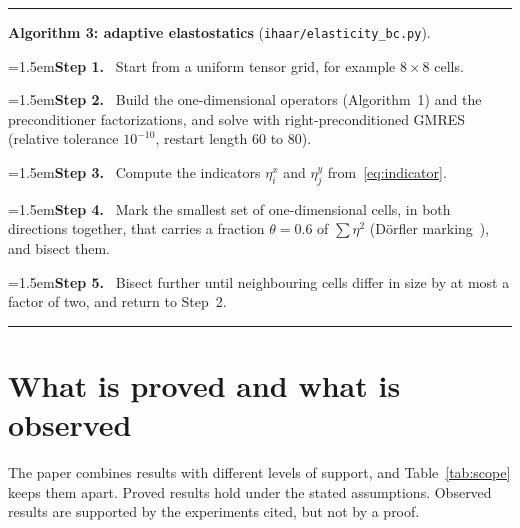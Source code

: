 \documentclass[preprint,12pt]{elsarticle}
\theoremstyle{remark}
\newcommand{\step}[1]{\par\noindent\hangindent=1.5em\hangafter=1\textbf{Step #1.}\ }
\begin{document}
\begin{algorithm}[t]\small\hrule\smallskip
\noindent\textbf{Algorithm 3: adaptive elastostatics} (\texttt{ihaar/elasticity\_bc.py}).
\step{1} Start from a uniform tensor grid, for example $8\times8$ cells.
\step{2} Build the one-dimensional operators (Algorithm~1) and the preconditioner factorizations, and solve with right-preconditioned GMRES (relative tolerance $10^{-10}$, restart length 60 to 80).
\step{3} Compute the indicators $\eta^x_i$ and $\eta^y_j$ from~\eqref{eq:indicator}.
\step{4} Mark the smallest set of one-dimensional cells, in both directions together, that carries a fraction $\theta=0.6$ of $\sum\eta^2$ (D\"orfler marking~\cite{dorfler1996convergent}), and bisect them.
\step{5} Bisect further until neighbouring cells differ in size by at most a factor of two, and return to Step~2.
\smallskip\hrule
\end{algorithm}

\section{What is proved and what is observed}\label{sec:scope}
The paper combines results with different levels of support, and Table~\ref{tab:scope} keeps them
apart. Proved results hold under the stated assumptions. Observed results are supported by the
experiments cited, but not by a proof.
\end{document}
